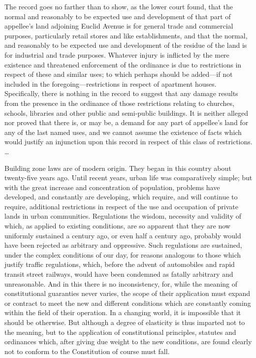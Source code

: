 The record goes no farther than to show, as the lower court found, that the
normal and reasonably to be expected use and development of that part of
appellee's land adjoining Euclid Avenue is for general trade and commercial
purposes, particularly retail stores and like establishments, and that the
normal, and reasonably to be expected use and development of the residue of the
land is for industrial and trade purposes. Whatever injury is inflicted by the
mere existence and threatened enforcement of the ordinance is due to
restrictions in respect of these and similar uses; to which perhaps should be
added---if not included in the foregoing---restrictions in respect of apartment
houses. Specifically, there is nothing in the record to suggest that any damage
results from the presence in the ordinance of those restrictions relating to
churches, schools, libraries and other public and semi-public buildings. It is
neither alleged nor proved that there is, or may be, a demand for any part of
appellee's land for any of the last named uses, and we cannot assume the
existence of facts which would justify an injunction upon this record in respect
of this class of restrictions. \ldots

Building zone laws are of modern origin. They began in this country about
twenty-five years ago. Until recent years, urban life was comparatively simple;
but with the great increase and concentration of population, problems have
developed, and constantly are developing, which require, and will continue to
require, additional restrictions in respect of the use and occupation of private
lands in urban communities. Regulations the wisdom, necessity and validity of
which, as applied to existing conditions, are so apparent that they are now
uniformly sustained a century ago, or even half a century ago, probably would
have been rejected as arbitrary and oppressive. Such regulations are sustained,
under the complex conditions of our day, for reasons analogous to those which
justify traffic regulations, which, before the advent of automobiles and rapid
transit street railways, would have been condemned as fatally arbitrary and
unreasonable. And in this there is no inconsistency, for, while the meaning of
constitutional guaranties never varies, the scope of their application must
expand or contract to meet the new and different conditions which are constantly
coming within the field of their operation. In a changing world, it is
impossible that it should be otherwise. But although a degree of elasticity is
thus imparted not to the meaning, but to the application of constitutional
principles, statutes and ordinances which, after giving due weight to the new
conditions, are found clearly not to conform to the Constitution of course must
fall.

